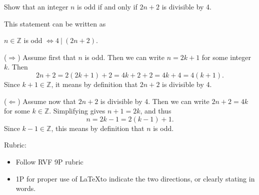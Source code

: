 \documentclass{article}
\theoremstyle{definition}
\begin{document}
\begin{question}
    Show that an integer $n$ is odd if and only if $2n+2$ is divisible by 4.
\end{question}
\begin{solution}
    This statement can be written as 
	\begin{center}
		$n \in \mathbb{Z}$ is odd $\iff 4 ~|~ (2n+2)$.
	\end{center}
    ($\Rightarrow$) Assume first that $n$ is odd. Then we can write $n = 2k+1$ for some integer $k$. Then
	\[
	2 n + 2 = 2 (2k + 1) + 2 = 4 k + 2 + 2 = 4 k + 4 = 4 (k+1).
	\]
	Since $k+1 \in \mathbb{Z}$, it means by definition that $2 n + 2$ is divisible by 4.
	
    ($\Leftarrow$)  Assume now that $2n + 2$ is divisible by 4. 
    Then we can write $2n + 2 = 4k$ for some $k \in \mathbb{Z}$. Simplifying gives $n + 1 = 2k$, and thus
	\[
	n = 2 k - 1 = 2 (k - 1) + 1.
	\]
    Since $k - 1 \in \mathbb{Z}$, this means by definition that $n$ is odd.
    
{\color{red} Rubric:
\begin{itemize}
\item Follow RVF 9P rubric 
\item 1P for proper use of \LaTeX to indicate the two directions, or clearly stating in words.
\end{itemize}}
\end{solution}
\end{document}
